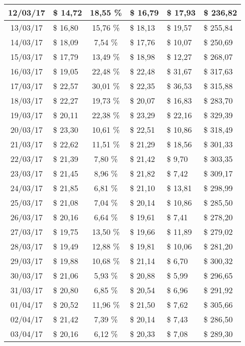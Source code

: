 \begin{center}
\begin{small}
\begin{longtable}{|c|l|c|l|l|l|}
12/03/17 & \$ 14,72 & 18,55 \% & \$ 16,79 & \$ 17,93 & \$ 236,82 \\ \hline
13/03/17 & \$ 16,80 & 15,76 \% & \$ 18,13 & \$ 19,57 & \$ 255,84 \\ \hline
14/03/17 & \$ 18,09 & 7,54 \% & \$ 17,76 & \$ 10,07 & \$ 250,69 \\ \hline
15/03/17 & \$ 17,79 & 13,49 \% & \$ 18,98 & \$ 12,27 & \$ 268,07 \\ \hline
16/03/17 & \$ 19,05 & 22,48 \% & \$ 22,48 & \$ 31,67 & \$ 317,63 \\ \hline
17/03/17 & \$ 22,57 & 30,01 \% & \$ 22,35 & \$ 36,53 & \$ 315,88 \\ \hline
18/03/17 & \$ 22,27 & 19,73 \% & \$ 20,07 & \$ 16,83 & \$ 283,70 \\ \hline
19/03/17 & \$ 20,11 & 22,38 \% & \$ 23,29 & \$ 22,16 & \$ 329,39 \\ \hline
20/03/17 & \$ 23,30 & 10,61 \% & \$ 22,51 & \$ 10,86 & \$ 318,49 \\ \hline
21/03/17 & \$ 22,62 & 11,51 \% & \$ 21,29 & \$ 18,56 & \$ 301,33 \\ \hline
22/03/17 & \$ 21,39 & 7,80 \% & \$ 21,42 & \$ 9,70 & \$ 303,35 \\ \hline
23/03/17 & \$ 21,45 & 8,96 \% & \$ 21,82 & \$ 7,42 & \$ 309,17 \\ \hline
24/03/17 & \$ 21,85 & 6,81 \% & \$ 21,10 & \$ 13,81 & \$ 298,99 \\ \hline
25/03/17 & \$ 21,08 & 7,04 \% & \$ 20,14 & \$ 10,86 & \$ 285,50 \\ \hline
26/03/17 & \$ 20,16 & 6,64 \% & \$ 19,61 & \$ 7,41 & \$ 278,20 \\ \hline
27/03/17 & \$ 19,75 & 13,50 \% & \$ 19,66 & \$ 11,89 & \$ 279,02 \\ \hline
28/03/17 & \$ 19,49 & 12,88 \% & \$ 19,81 & \$ 10,06 & \$ 281,20 \\ \hline
29/03/17 & \$ 19,88 & 10,68 \% & \$ 21,14 & \$ 6,70 & \$ 300,32 \\ \hline
30/03/17 & \$ 21,06 & 5,93 \% & \$ 20,88 & \$ 5,99 & \$ 296,65 \\ \hline
31/03/17 & \$ 20,80 & 6,85 \% & \$ 20,54 & \$ 6,96 & \$ 291,92 \\ \hline
01/04/17 & \$ 20,52 & 11,96 \% & \$ 21,50 & \$ 7,62 & \$ 305,66 \\ \hline
02/04/17 & \$ 21,42 & 7,39 \% & \$ 20,14 & \$ 7,43 & \$ 286,50 \\ \hline
03/04/17 & \$ 20,16 & 6,12 \% & \$ 20,33 & \$ 7,08 & \$ 289,30 \\ \hline

\end{longtable}
\end{small}
\end{center}
